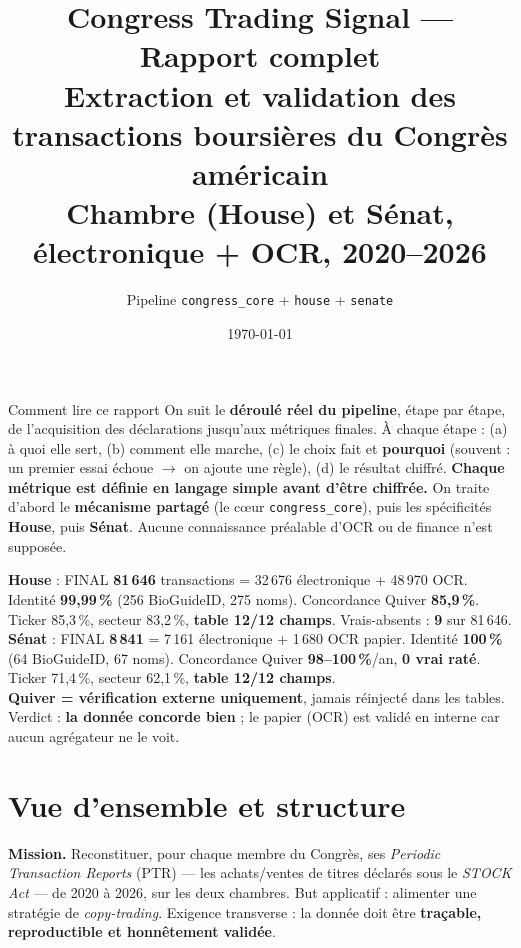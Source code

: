 \documentclass[11pt,a4paper]{article}
\title{\textbf{Congress Trading Signal --- Rapport complet}\\[3pt]
\large Extraction et validation des transactions boursières du Congrès américain\\
\large Chambre (House) \textbf{et} Sénat, électronique + OCR, 2020--2026}
\author{Pipeline \texttt{congress\_core} + \texttt{house} + \texttt{senate}}
\date{\today}
\begin{document}
\maketitle

\begin{defbox}{Comment lire ce rapport}
On suit le \textbf{déroulé réel du pipeline}, étape par étape, de l'acquisition des déclarations
jusqu'aux métriques finales. À chaque étape : (a) à quoi elle sert, (b) comment elle marche, (c) le
choix fait et \textbf{pourquoi} (souvent : un premier essai échoue $\rightarrow$ on ajoute une règle), (d) le
résultat chiffré. \textbf{Chaque métrique est définie en langage simple avant d'être chiffrée.} On
traite d'abord le \textbf{mécanisme partagé} (le c\oe{}ur \texttt{congress\_core}), puis les spécificités
\textbf{House}, puis \textbf{Sénat}. Aucune connaissance préalable d'OCR ou de finance n'est supposée.
\end{defbox}

\begin{tcolorbox}[colback=blue!4,colframe=blue!40!black,title=\textbf{Chiffres clés (résumé exécutif)}]
\textbf{House} : FINAL \textbf{81\,646} transactions = 32\,676 électronique + 48\,970 OCR. Identité
\textbf{99,99\,\%} (256 BioGuideID, 275 noms). Concordance Quiver \textbf{85,9\,\%}. Ticker 85,3\,\%,
secteur 83,2\,\%, \textbf{table 12/12 champs}. Vrais-absents : \textbf{9} sur 81\,646.\\
\textbf{Sénat} : FINAL \textbf{8\,841} = 7\,161 électronique + 1\,680 OCR papier. Identité \textbf{100\,\%}
(64 BioGuideID, 67 noms). Concordance Quiver \textbf{98--100\,\%}/an, \textbf{0 vrai raté}. Ticker
71,4\,\%, secteur 62,1\,\%, \textbf{table 12/12 champs}.\\[2pt]
\textbf{Quiver = vérification externe uniquement}, jamais réinjecté dans les tables.
Verdict : \textbf{la donnée concorde bien} ; le papier (OCR) est validé en interne car aucun agrégateur
ne le voit.
\end{tcolorbox}

\tableofcontents
\bigskip

\section{Vue d'ensemble et structure}

\textbf{Mission.} Reconstituer, pour chaque membre du Congrès, ses \emph{Periodic Transaction Reports}
(PTR) --- les achats/ventes de titres déclarés sous le \emph{STOCK Act} --- de 2020 à 2026, sur les deux
chambres. But applicatif : alimenter une stratégie de \emph{copy-trading}. Exigence transverse : la
donnée doit être \textbf{traçable, reproductible et honnêtement validée}.
\end{document}
